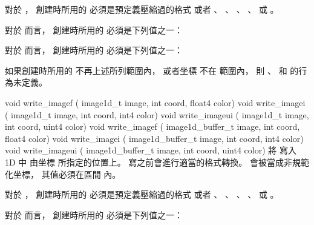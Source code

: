 對於 ，
創建時所用的  必須是預定義壓縮過的格式
或者 、 、 、
 、  或 。

對於  而言，
創建時所用的  必須是下列值之一：
\startigBase
\item {}
\item {}
\item {}
\stopigBase

對於  而言，
創建時所用的  必須是下列值之一：
\startigBase
\item {}
\item {}
\item {}
\stopigBase

如果創建時所用的  不再上述所列範圍內，
或者坐標  不在 
範圍內，
則 、  和  的行為未定義。
\stopbuffer

void write_imagef (
	image1d_t image,
	int coord,
	float4 color)
void write_imagei (
	image1d_t image,
	int coord,
	int4 color)
void write_imageui (
	image1d_t image,
	int coord,
	uint4 color)
void write_imagef (
	image1d_buffer_t image,
	int coord,
	float4 color)
void write_imagei (
	image1d_buffer_t image,
	int coord,
	int4 color)
void write_imageui (
	image1d_buffer_t image,
	int coord,
	uint4 color)
\stopbuffer
{}
將  寫入 1D   中
由坐標  所指定的位置上。
寫之前會進行適當的格式轉換。
 會被當成非規範化坐標，
其值必須在區間  內。

對於 ，
創建時所用的  必須是預定義壓縮過的格式
或者 、 、 、
 、  或 。

對於  而言，
創建時所用的  必須是下列值之一：
\startigBase
\item {}
\item {}
\item {}
\stopigBase

